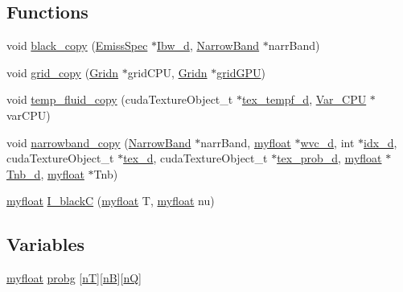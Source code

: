 \subsection*{Functions}
\begin{DoxyCompactItemize}
\item 
void \hyperlink{memory__copy_8cu_acdc271da1d0803d8e7c3d0ee14790a9c}{black\+\_\+copy} (\hyperlink{structEmissSpec}{Emiss\+Spec} $\ast$\hyperlink{mc__gpu_8cu_ae0d8a42c87785ba8b4a1792ff67ab599}{Ibw\+\_\+d}, \hyperlink{classNarrowBand}{Narrow\+Band} $\ast$narr\+Band)
\item 
void \hyperlink{memory__copy_8cu_af1a4a3bb86afa191bf06b8ba47667510}{grid\+\_\+copy} (\hyperlink{classGridn}{Gridn} $\ast$grid\+C\+PU, \hyperlink{classGridn}{Gridn} $\ast$\hyperlink{mc__gpu_8cu_a74de1e808220d77a904a4dd5835cdead}{grid\+G\+PU})
\item 
void \hyperlink{memory__copy_8cu_ab8890b05006119c09b7bead311bea278}{temp\+\_\+fluid\+\_\+copy} (cuda\+Texture\+Object\+\_\+t $\ast$\hyperlink{mc__gpu_8cu_aff98f241432bdd0d6a9caccb19426859}{tex\+\_\+tempf\+\_\+d}, \hyperlink{classVar__CPU}{Var\+\_\+\+C\+PU} $\ast$var\+C\+PU)
\item 
void \hyperlink{memory__copy_8cu_aa8fddbe90f3f7212e8527b970c161fc7}{narrowband\+\_\+copy} (\hyperlink{classNarrowBand}{Narrow\+Band} $\ast$narr\+Band, \hyperlink{param_8h_a5f097c9f3873af7be7fc156e6a06ca5e}{myfloat} $\ast$\hyperlink{mc__gpu_8cu_a64cbc4394e0b9bd53897ba9c9fb88fc4}{wvc\+\_\+d}, int $\ast$\hyperlink{mc__gpu_8cu_a0092894182b745f3aaa00baacf024329}{idx\+\_\+d}, cuda\+Texture\+Object\+\_\+t $\ast$\hyperlink{mc__gpu_8cu_ad5c4d0a58301ccacad07ee3641a693b8}{tex\+\_\+d}, cuda\+Texture\+Object\+\_\+t $\ast$\hyperlink{mc__gpu_8cu_af5760f0df5d9e1fdc7eb6c8ff7ef978d}{tex\+\_\+prob\+\_\+d}, \hyperlink{param_8h_a5f097c9f3873af7be7fc156e6a06ca5e}{myfloat} $\ast$\hyperlink{mc__gpu_8cu_a1cf79772104f5b8b803bcbf4c6b5a053}{Tnb\+\_\+d}, \hyperlink{param_8h_a5f097c9f3873af7be7fc156e6a06ca5e}{myfloat} $\ast$Tnb)
\item 
\hyperlink{param_8h_a5f097c9f3873af7be7fc156e6a06ca5e}{myfloat} \hyperlink{memory__copy_8cu_a4377903e1c6e764da89fd87700eb74c3}{I\+\_\+blackC} (\hyperlink{param_8h_a5f097c9f3873af7be7fc156e6a06ca5e}{myfloat} T, \hyperlink{param_8h_a5f097c9f3873af7be7fc156e6a06ca5e}{myfloat} nu)
\end{DoxyCompactItemize}
\subsection*{Variables}
\begin{DoxyCompactItemize}
\item 
\hyperlink{param_8h_a5f097c9f3873af7be7fc156e6a06ca5e}{myfloat} \hyperlink{memory__copy_8cu_a154b4ee2e5ccbfa05ff4d8df0337f5a3}{probg} \mbox{[}\hyperlink{NarrowBand_8h_a11e43991170d325cb21737c8e7d5acaa}{nT}\mbox{]}\mbox{[}\hyperlink{NarrowBand_8h_aca13f491975ccaa9a165708a85753bda}{nB}\mbox{]}\mbox{[}\hyperlink{NarrowBand_8h_ac207cb86a4c7e5bc1973837ee2339e59}{nQ}\mbox{]}
\end{DoxyCompactItemize}


